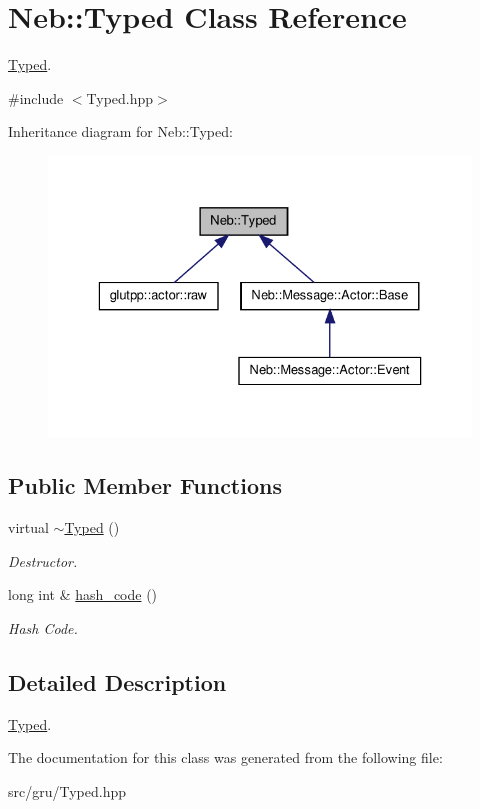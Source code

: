 \hypertarget{classNeb_1_1Typed}{\section{\-Neb\-:\-:\-Typed \-Class \-Reference}
\label{classNeb_1_1Typed}
}


\hyperlink{classNeb_1_1Typed}{\-Typed}.  




{\ttfamily \#include $<$\-Typed.\-hpp$>$}



\-Inheritance diagram for \-Neb\-:\-:\-Typed\-:
\nopagebreak
\begin{figure}[H]
\begin{center}
\leavevmode
\includegraphics[width=329pt]{classNeb_1_1Typed__inherit__graph}
\end{center}
\end{figure}
\subsection*{\-Public \-Member \-Functions}
\begin{DoxyCompactItemize}
\item 
\hypertarget{classNeb_1_1Typed_ac7a0fd653ad4c09abc20fc9f24942042}{virtual \hyperlink{classNeb_1_1Typed_ac7a0fd653ad4c09abc20fc9f24942042}{$\sim$\-Typed} ()}\label{classNeb_1_1Typed_ac7a0fd653ad4c09abc20fc9f24942042}

\begin{DoxyCompactList}\small\item\em \-Destructor. \end{DoxyCompactList}\item 
\hypertarget{classNeb_1_1Typed_a75878612e933c37ce060bb0d63889051}{long int \& \hyperlink{classNeb_1_1Typed_a75878612e933c37ce060bb0d63889051}{hash\-\_\-code} ()}\label{classNeb_1_1Typed_a75878612e933c37ce060bb0d63889051}

\begin{DoxyCompactList}\small\item\em \-Hash \-Code. \end{DoxyCompactList}\end{DoxyCompactItemize}


\subsection{\-Detailed \-Description}
\hyperlink{classNeb_1_1Typed}{\-Typed}. 

\-The documentation for this class was generated from the following file\-:\begin{DoxyCompactItemize}
\item 
src/gru/\-Typed.\-hpp\end{DoxyCompactItemize}
